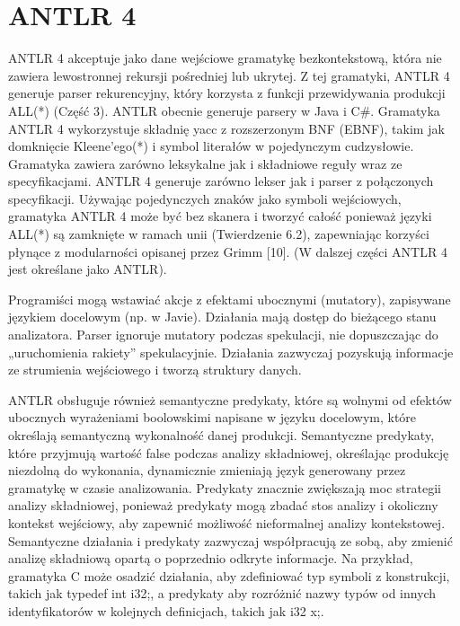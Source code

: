 \section{ANTLR 4}
ANTLR 4 akceptuje jako dane wejściowe gramatykę bezkontekstową, która nie
zawiera lewostronnej rekursji pośredniej lub ukrytej. \footnotemark[2]
Z tej gramatyki, ANTLR 4 generuje parser rekurencyjny, który korzysta z funkcji
przewidywania produkcji ALL(*) (Część 3). ANTLR obecnie generuje parsery w Java
i C{\#}.
Gramatyka ANTLR 4 wykorzystuje składnię yacc z rozszerzonym BNF (EBNF),
takim jak domknięcie Kleene'ego(*) i symbol literałów w pojedynczym cudzysłowie.
Gramatyka zawiera zarówno leksykalne jak i składniowe reguły wraz ze specyfikacjami.
ANTLR 4 generuje zarówno lekser jak i parser z połączonych specyfikacji.
Używając pojedynczych znaków jako symboli wejściowych, gramatyka ANTLR 4
może być bez skanera i tworzyć całość ponieważ języki ALL(*) są zamknięte
w ramach unii (Twierdzenie 6.2), zapewniając korzyści płynące z modularności
opisanej przez Grimm [10]. (W dalszej części ANTLR 4 jest określane jako ANTLR).
\par
Programiści mogą wstawiać akcje z efektami ubocznymi (mutatory),
zapisywane językiem docelowym (np. w Javie). Działania mają dostęp do bieżącego
stanu analizatora. Parser ignoruje mutatory podczas spekulacji,
nie dopuszczając do „uruchomienia rakiety” spekulacyjnie.
Działania zazwyczaj pozyskują informacje ze strumienia wejściowego
i tworzą struktury danych.
\par
ANTLR obsługuje również semantyczne predykaty, które są wolnymi
od efektów ubocznych wyrażeniami boolowskimi napisane w języku docelowym,
które określają semantyczną wykonalność danej produkcji.
Semantyczne predykaty, które przyjmują wartość false podczas analizy składniowej,
określając produkcję niezdolną do wykonania, dynamicznie zmieniają
język generowany przez gramatykę w czasie analizowania.\footnotemark[3]
Predykaty znacznie zwiększają moc strategii analizy składniowej, ponieważ
predykaty mogą zbadać stos analizy i okoliczny kontekst wejściowy,
aby zapewnić możliwość nieformalnej analizy kontekstowej.
Semantyczne działania i predykaty zazwyczaj współpracują ze sobą, aby
zmienić analizę składniową opartą o poprzednio odkryte informacje.
Na przykład, gramatyka C może osadzić działania, aby zdefiniować typ symboli
z konstrukcji, takich jak typedef int i32;, a predykaty aby rozróżnić nazwy
typów od innych identyfikatorów w kolejnych definicjach, takich jak i32 x;.
